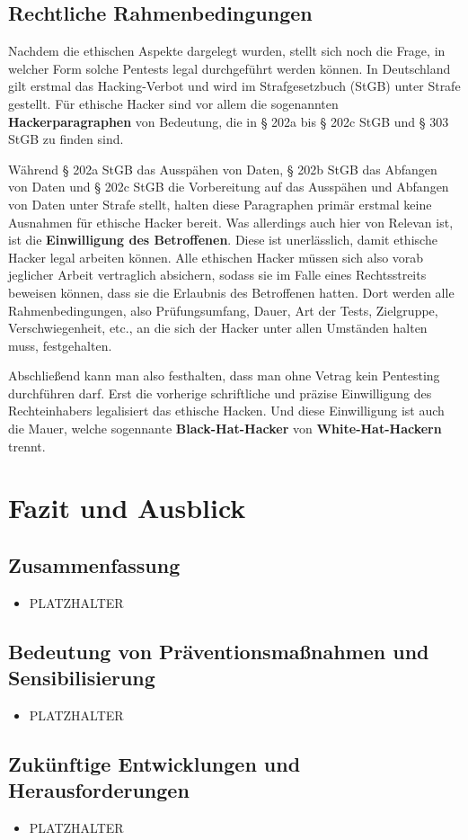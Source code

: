 \documentclass[12pt, a4paper, oneside]{scrartcl}
\begin{document}
\subsection{Rechtliche Rahmenbedingungen}
Nachdem die ethischen Aspekte dargelegt wurden, stellt sich noch die Frage, in welcher Form solche 
Pentests legal durchgeführt werden können. In Deutschland gilt erstmal das Hacking-Verbot und wird 
im Strafgesetzbuch (StGB) unter Strafe gestellt. Für ethische Hacker sind vor allem die  
sogenannten \textbf{Hackerparagraphen} von Bedeutung, die in § 202a bis § 202c StGB und § 303 StGB zu finden sind.
\par
Während § 202a StGB das Ausspähen von Daten, § 202b StGB das Abfangen von Daten und § 202c StGB 
die Vorbereitung auf das Ausspähen und Abfangen von Daten unter Strafe stellt, halten diese Paragraphen
primär erstmal keine Ausnahmen für ethische Hacker bereit. Was allerdings auch hier von Relevan ist, 
ist die \textbf{Einwilligung des Betroffenen}. Diese ist unerlässlich, damit ethische Hacker legal arbeiten können.
Alle ethischen Hacker müssen sich also vorab jeglicher Arbeit vertraglich absichern, sodass sie im 
Falle eines Rechtsstreits beweisen können, dass sie die Erlaubnis des Betroffenen hatten. Dort werden alle
Rahmenbedingungen, also Prüfungsumfang, Dauer, Art der Tests, Zielgruppe, Verschwiegenheit, etc., an die sich der Hacker 
unter allen Umständen halten muss, festgehalten.
\par
Abschließend kann man also festhalten, dass man ohne Vetrag kein Pentesting durchführen darf. Erst die vorherige
schriftliche und präzise Einwilligung des Rechteinhabers legalisiert das ethische Hacken. Und diese Einwilligung
ist auch die Mauer, welche sogennante \textbf{Black-Hat-Hacker} von \textbf{White-Hat-Hackern} trennt.

\section{Fazit und Ausblick}

\subsection{Zusammenfassung}
\begin{itemize}
  \item PLATZHALTER
\end{itemize}

\subsection{Bedeutung von Präventionsmaßnahmen und Sensibilisierung}
\begin{itemize}
  \item PLATZHALTER
\end{itemize}

\subsection{Zukünftige Entwicklungen und Herausforderungen}
\begin{itemize}
  \item PLATZHALTER
\end{itemize}

\clearpage
\printbibliography[title={Literaturverzeichnis}]
\end{document}
